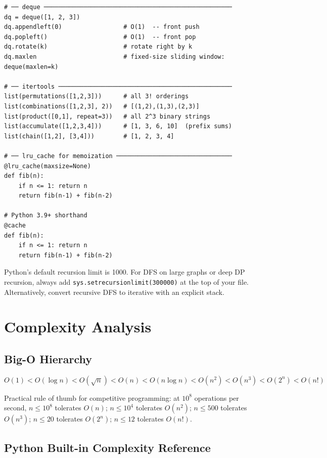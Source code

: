 \documentclass[11pt,a4paper]{report}
\newcommand{\py}[1]{\texttt{\color{pyblue}#1}}
\begin{document}
\begin{lstlisting}
# ── deque ────────────────────────────────────────────────────
dq = deque([1, 2, 3])
dq.appendleft(0)                 # O(1)  -- front push
dq.popleft()                     # O(1)  -- front pop
dq.rotate(k)                     # rotate right by k
dq.maxlen                        # fixed-size sliding window: deque(maxlen=k)

# ── itertools ────────────────────────────────────────────────
list(permutations([1,2,3]))      # all 3! orderings
list(combinations([1,2,3], 2))   # [(1,2),(1,3),(2,3)]
list(product([0,1], repeat=3))   # all 2^3 binary strings
list(accumulate([1,2,3,4]))      # [1, 3, 6, 10]  (prefix sums)
list(chain([1,2], [3,4]))        # [1, 2, 3, 4]

# ── lru_cache for memoization ────────────────────────────────
@lru_cache(maxsize=None)
def fib(n):
    if n <= 1: return n
    return fib(n-1) + fib(n-2)

# Python 3.9+ shorthand
@cache
def fib(n):
    if n <= 1: return n
    return fib(n-1) + fib(n-2)
\end{lstlisting}

\begin{warnbox}
Python's default recursion limit is 1000. For DFS on large graphs or deep DP recursion, always add \py{sys.setrecursionlimit(300000)} at the top of your file. Alternatively, convert recursive DFS to iterative with an explicit stack.
\end{warnbox}

\chapter{Complexity Analysis}

\section{Big-O Hierarchy}

\[
O(1) < O(\log n) < O(\sqrt{n}) < O(n) < O(n \log n) < O(n^2) < O(n^3) < O(2^n) < O(n!)
\]

Practical rule of thumb for competitive programming: at $10^8$ operations per second,
$n \le 10^8$ tolerates $O(n)$; $n \le 10^4$ tolerates $O(n^2)$; $n \le 500$ tolerates $O(n^3)$;
$n \le 20$ tolerates $O(2^n)$; $n \le 12$ tolerates $O(n!)$.

\section{Python Built-in Complexity Reference}
\end{document}
